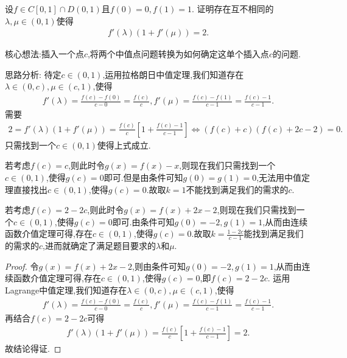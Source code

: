 \documentclass[../../main.tex]{subfiles}%
\begin{document}
\begin{example}
设\(f\in C[0,1]\cap D(0,1)\)且\(f(0)=0,f(1)=1\). 证明存在互不相同的\(\lambda,\mu\in(0,1)\)使得
\begin{align*}
f'(\lambda)(1 + f'(\mu))=2.
\end{align*} 
\end{example}
\begin{note}
核心想法:插入一个点$c$,将两个中值点问题转换为如何确定这单个插入点$c$的问题.
\end{note}
\begin{remark}
思路分析:
待定\(c\in(0,1)\),运用拉格朗日中值定理,我们知道存在\(\lambda\in(0,c),\mu\in(c,1)\),使得
\begin{align*}
f'(\lambda)=\frac{f(c)-f(0)}{c - 0}=\frac{f(c)}{c},f'(\mu)=\frac{f(c)-f(1)}{c - 1}=\frac{f(c)-1}{c - 1}.
\end{align*}
需要
\begin{align*}
2=f' (\lambda )(1+f' (\mu ))=\frac{f(c)}{c}\left[ 1+\frac{f(c)-1}{c-1} \right] \Longleftrightarrow \left( f\left( c \right) +c \right) \left( f\left( c \right) +2c-2 \right) =0.
\end{align*}
只需找到一个\(c\in(0,1)\)使得上式成立.

若考虑\(f(c)=c\),则此时令\(g(x)=f(x)-x\),则现在我们只需找到一个\(c\in(0,1)\),使得\(g(c)=0\)即可.但是由条件可知\(g(0)=g(1)=0\),无法用中值定理直接找出\(c\in(0,1)\),使得\(g(c)=0\).故取$k=1$不能找到满足我们的需求的$c$.

若考虑\(f(c)=2 - 2c\),则此时令\(g(x)=f(x)+2x - 2\),则现在我们只需找到一个\(c\in(0,1)\),使得\(g(c)=0\)即可.由条件可知\(g(0)=-2,g(1)=1\),从而由连续函数介值定理可得,存在\(c\in(0,1)\),使得\(g(c)=0\).故取$k=\frac{1 - 2c}{c - 1}$能找到满足我们的需求的$c$,进而就确定了满足题目要求的\(\lambda\)和\(\mu\). 
\end{remark}
\begin{proof}

令\(g(x)=f(x)+2x - 2\),则由条件可知\(g(0)=-2,g(1)=1\),从而由连续函数介值定理可得,存在\(c\in(0,1)\),使得\(g(c)=0\),即\(f(c)=2 - 2c\). 
运用Lagrange中值定理,我们知道存在\(\lambda\in(0,c),\mu\in(c,1)\),使得
\begin{align*}
f'(\lambda)=\frac{f(c)-f(0)}{c - 0}=\frac{f(c)}{c},f'(\mu)=\frac{f(c)-f(1)}{c - 1}=\frac{f(c)-1}{c - 1}.
\end{align*}
再结合$f(c)=2-2c$可得
\begin{align*}
f' (\lambda )(1+f' (\mu ))=\frac{f(c)}{c}\left[ 1+\frac{f(c)-1}{c-1} \right] =2.
\end{align*}
故结论得证.

\end{proof}
\end{document}
